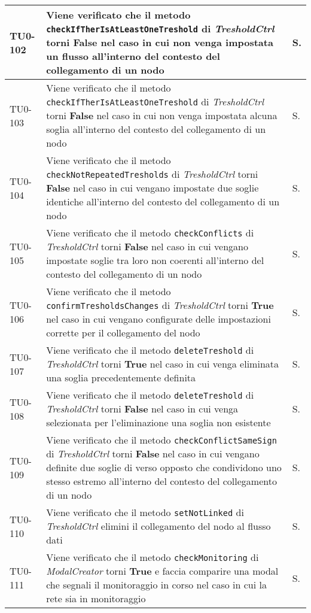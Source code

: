 \begin{longtable}{|C{.15\textwidth}|m{.66\textwidth}|C{.10\textwidth}|}
\hline
TU0-102 & Viene verificato che il metodo \texttt{checkIfTherIsAtLeastOneTreshold} di \textit{TresholdCtrl} torni \textbf{False} nel caso in cui non venga impostata un flusso all'interno del contesto del collegamento di un nodo & S.\\
\hline
{}TU0-103 & Viene verificato che il metodo \texttt{checkIfTherIsAtLeastOneTreshold} di \textit{TresholdCtrl} torni \textbf{False} nel caso in cui non venga impostata alcuna soglia all'interno del contesto del collegamento di un nodo & S.\\
\hline
TU0-104 & Viene verificato che il metodo \texttt{checkNotRepeatedTresholds} di \textit{TresholdCtrl} torni \textbf{False} nel caso in cui vengano impostate due soglie identiche all'interno del contesto del collegamento di un nodo & S.\\
\hline
{}TU0-105 & Viene verificato che il metodo \texttt{checkConflicts} di \textit{TresholdCtrl} torni \textbf{False} nel caso in cui vengano impostate soglie tra loro non coerenti all'interno del contesto del collegamento di un nodo & S.\\
\hline
TU0-106 & Viene verificato che il metodo \texttt{confirmTresholdsChanges} di \textit{TresholdCtrl} torni \textbf{True} nel caso in cui vengano configurate delle impostazioni corrette per il collegamento del nodo & S.\\
\hline
{}TU0-107 & Viene verificato che il metodo \texttt{deleteTreshold} di \textit{TresholdCtrl} torni \textbf{True} nel caso in cui venga eliminata una soglia precedentemente definita & S.\\
\hline
TU0-108 & Viene verificato che il metodo \texttt{deleteTreshold} di \textit{TresholdCtrl} torni \textbf{False} nel caso in cui venga selezionata per l'eliminazione una soglia non esistente & S.\\
\hline
{}TU0-109 & Viene verificato che il metodo \texttt{checkConflictSameSign} di \textit{TresholdCtrl} torni \textbf{False} nel caso in cui vengano definite due soglie di verso opposto che condividono uno stesso estremo all'interno del contesto del collegamento di un nodo & S.\\
\hline
TU0-110 & Viene verificato che il metodo \texttt{setNotLinked} di \textit{TresholdCtrl} elimini il collegamento del nodo al flusso dati & S.\\
\hline
{}TU0-111 & Viene verificato che il metodo \texttt{checkMonitoring} di \textit{ModalCreator} torni \textbf{True} e faccia comparire una modal che segnali il monitoraggio in corso nel caso in cui la rete sia in monitoraggio & S. \\

\end{longtable}
